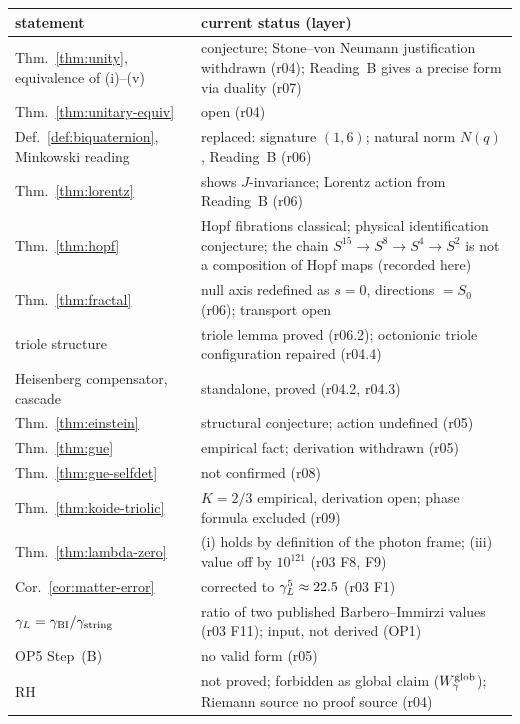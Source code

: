 \begin{center}
\small
\begin{tabular}{@{}>{\raggedright\arraybackslash}p{}>{\raggedright\arraybackslash}p{}@{}}
\toprule
statement & current status (layer)\\
\midrule
Thm.~\ref{thm:unity}, equivalence of (i)--(v) & conjecture; Stone--von Neumann justification withdrawn (r04); Reading~B gives a precise form via duality (r07)\\
Thm.~\ref{thm:unitary-equiv} & open (r04)\\
Def.~\ref{def:biquaternion}, Minkowski reading & replaced: signature \((1,6)\); natural norm \(N(q)\), Reading~B (r06)\\
Thm.~\ref{thm:lorentz} & shows \(J\)-invariance; Lorentz action from Reading~B (r06)\\
Thm.~\ref{thm:hopf} & Hopf fibrations classical; physical identification conjecture; the chain \(S^{15}\to S^8\to S^4\to S^2\) is not a composition of Hopf maps (recorded here)\\
Thm.~\ref{thm:fractal} & null axis redefined as \(s=0\), directions \(=S_0\) (r06); transport open\\
triole structure & triole lemma proved (r06.2); octonionic triole configuration repaired (r04.4)\\
Heisenberg compensator, cascade & standalone, proved (r04.2, r04.3)\\
Thm.~\ref{thm:einstein} & structural conjecture; action undefined (r05)\\
Thm.~\ref{thm:gue} & empirical fact; derivation withdrawn (r05)\\
Thm.~\ref{thm:gue-selfdet} & not confirmed (r08)\\
Thm.~\ref{thm:koide-triolic} & \(K=2/3\) empirical, derivation open; phase formula excluded (r09)\\
Thm.~\ref{thm:lambda-zero} & (i) holds by definition of the photon frame; (iii) value off by \(10^{121}\) (r03 F8, F9)\\
Cor.~\ref{cor:matter-error} & corrected to \(\gamma_L^5\approx22.5\) (r03 F1)\\
\(\gamma_L=\gamma_{\mathrm{BI}}/\gamma_{\mathrm{string}}\) & ratio of two published Barbero--Immirzi values (r03 F11); input, not derived (OP1)\\
OP5 Step~(B) & no valid form (r05)\\
RH & not proved; forbidden as global claim (\(W_\gamma^{\rm glob}\)); Riemann source no proof source (r04)\\
\bottomrule
\end{tabular}
\end{center}

